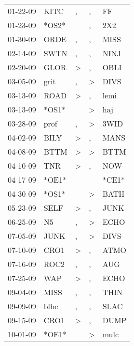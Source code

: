 \begin{supertabular}{lllll}
 01-22-09 &   KITC &                , &                , &     FF \\
 01-23-09 &  *OS2* &                  &                , &    2X2 \\
 01-30-09 &   ORDE &                , &                , &   MISS \\
 02-14-09 &   SWTN &                , &                , &   NINJ \\
 02-20-09 &   GLOR &     \textgreater &                , &   OBLI \\
 03-05-09 &   grit &                , &     \textgreater &   DIVS \\
 03-13-09 &   ROAD &     \textgreater &                , &   lemi \\
 03-13-09 &  *OS1* &                  &     \textgreater &    haj \\
 03-28-09 &   prof &                , &     \textgreater &   3WID \\
 04-02-09 &   BILY &     \textgreater &                , &   MANS \\
 04-08-09 &   BTTM &     \textgreater &     \textgreater &   BTTM \\
 04-10-09 &    TNR &     \textgreater &                , &    NOW \\
 04-17-09 &  *OE1* &                  &                  &  *CE1* \\
 04-30-09 &  *OS1* &                  &     \textgreater &   BATH \\
 05-23-09 &   SELF &     \textgreater &                , &   JUNK \\
 06-25-09 &     N5 &                , &     \textgreater &   ECHO \\
 07-05-09 &   JUNK &                , &     \textgreater &   DIVS \\
 07-10-09 &   CRO1 &     \textgreater &                , &   ATMO \\
 07-16-09 &   ROC2 &                , &                , &    AUG \\
 07-25-09 &    WAP &     \textgreater &                , &   ECHO \\
 09-04-09 &   MISS &                , &                , &   THIN \\
 09-09-09 &   blbc &                , &                , &   SLAC \\
 09-15-09 &   CRO1 &     \textgreater &                , &   DUMP \\
 10-01-09 &  *OE1* &                  &     \textgreater &   mulc \\

\end{supertabular}
